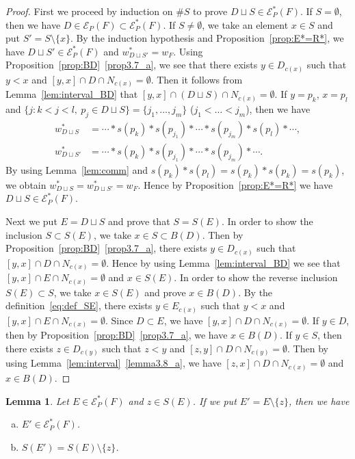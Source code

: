 \documentclass[10pt]{amsart}
\newtheorem{lemm}[theo]{Lemma}
\theoremstyle{definition}
\theoremstyle{remark}
\newcommand\EE{\mathcal{E}}
\begin{document}
\begin{proof}
First we proceed by induction on $\# S$ to prove $D \sqcup S \in \EE^*_P(F)$.
If $S = \emptyset$, then we have $D \in \EE_P(F) \subset \EE^*_P(F)$.
If $S \neq \emptyset$, we take an element $x \in S$ and put $S' = S \setminus \{ x \}$.
By the induction hypothesis and Proposition~\ref{prop:E*=R*}, 
we have $D \sqcup S' \in \EE^*_P(F)$ and $w^*_{D \sqcup S'} = w_F$.
Using Proposition~\ref{prop:BD}~\ref{prop3.7_a}, we see that there exists $y \in D_{c(x)}$ 
such that $y<x$ and $[y,x] \cap D \cap N_{c(x)} = \emptyset$.
Then it follows from Lemma~\ref{lem:interval_BD} that $[y,x] \cap (D \sqcup S) \cap N_{c(x)} = \emptyset$.
If $y = p_k$, $x = p_l$ and $\{ j : k < j < l, \ p_j \in D \sqcup S \} = \{ j_1, \dots, j_m \}$ 
($j_1 < \dots < j_m$), then we have 
\begin{align*}
w^*_{D \sqcup S} &= \cdots * s(p_k) * s(p_{j_1}) * \cdots * s(p_{j_m}) * s(p_l) * \cdots,
\\
w^*_{D \sqcup S'} &= \cdots * s(p_k) * s(p_{j_1}) * \cdots * s(p_{j_m}) * \cdots.
\end{align*}
By using Lemma~\ref{lem:comm} and $s(p_k)*s(p_l) = s(p_k) * s(p_k) = s(p_k)$, 
we obtain $w^*_{D \sqcup S} = w^*_{D \sqcup S'} = w_F$.
Hence by Proposition~\ref{prop:E*=R*} we have $D \sqcup S \in \EE^*_P(F)$.

Next we put $E = D \sqcup S$ and prove that $S = S(E)$.
In order to show the inclusion $S \subset S(E)$, we take $x \in S \subset B(D)$.
Then by Proposition~\ref{prop:BD}~\ref{prop3.7_a}, there exists $y \in D_{c(x)}$ 
such that $[y,x] \cap D \cap N_{c(x)} = \emptyset$.
Hence by using Lemma~\ref{lem:interval_BD} we see that $[y,x] \cap E \cap N_{c(x)} = \emptyset$ 
and $x \in S(E)$.
In order to show the reverse inclusion $S(E) \subset S$, we take $x \in S(E)$ and prove $x \in B(D)$.
By the definition~\eqref{eq:def_SE}, there exists $y \in E_{c(x)}$ 
such that $y < x$ and $[y,x] \cap E \cap N_{c(x)} = \emptyset$.
Since $D \subset E$, we have $[y,x] \cap D \cap N_{c(x)} = \emptyset$.
If $y \in D$, then by Proposition~\ref{prop:BD}~\ref{prop3.7_a}, we have $x \in B(D)$.
If $y \in S$, then there exists $z \in D_{c(y)}$ such that $z<y$ and $[z,y] \cap D \cap N_{c(y)} = \emptyset$.
Then by using Lemma~\ref{lem:interval}~\ref{lemma3.8_a}, we have $[z,x] \cap D \cap N_{c(x)} = \emptyset$ and $x \in B(D)$.
\end{proof}

\eject
\begin{lemm}
\label{lem:SE3}
Let $E \in \EE^*_P(F)$ and $z \in S(E)$. If we put $E' = E \setminus \{ z \}$, then we have
\begin{enumerate}[(a)]
\item\label{lemma3.17_a} %
$E' \in \EE^*_P(F)$.
\item\label{lemma3.17_b} %
$S( E' ) = S(E) \setminus \{ z \}$.
\end{enumerate}
\end{lemm}
\end{document}
